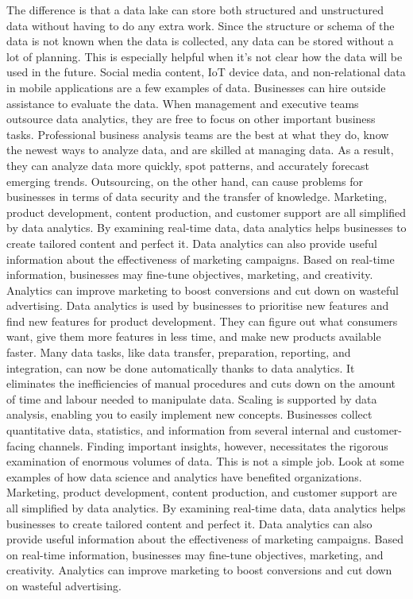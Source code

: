 \documentclass[journal]{IEEEtran}
\begin{document}
\par The difference is that a data lake can store both structured and unstructured data without having to do any extra work. Since the structure or schema of the data is not known when the data is collected, any data can be stored without a lot of planning. This is especially helpful when it's not clear how the data will be used in the future. Social media content, IoT device data, and non-relational data in mobile applications are a few examples of data. Businesses can hire outside assistance to evaluate the data. When management and executive teams outsource data analytics, they are free to focus on other important business tasks. Professional business analysis teams are the best at what they do, know the newest ways to analyze data, and are skilled at managing data. As a result, they can analyze  data more quickly, spot patterns, and accurately forecast emerging trends. Outsourcing, on the other hand, can cause problems for businesses in terms of data security and the transfer of knowledge. Marketing, product development, content production, and customer support are all simplified by data analytics. By examining real-time data, data analytics helps businesses to create tailored content and perfect it. Data analytics can also provide useful information about the effectiveness of marketing campaigns. Based on real-time information, businesses may fine-tune objectives, marketing, and creativity. Analytics can improve marketing to boost conversions and cut down on wasteful advertising. Data analytics is used by businesses to prioritise new features and find new features for product development. They can figure out what consumers want, give them more features in less time, and make new products available faster. Many data tasks, like data transfer, preparation, reporting, and integration, can now be done automatically thanks to data analytics. It eliminates the inefficiencies of manual procedures and cuts down on the amount of time and labour needed to manipulate data. Scaling is supported by data analysis, enabling you to easily implement new concepts. Businesses collect quantitative data, statistics, and information from several internal and customer-facing channels. Finding important insights, however, necessitates the rigorous examination of enormous volumes of data. This is not a simple job. Look at some examples of how data science and analytics have benefited organizations. Marketing, product development, content production, and customer support are all simplified by data analytics. By examining real-time data, data analytics helps businesses to create tailored content and perfect it. Data analytics can also provide useful information about the effectiveness of marketing campaigns. Based on real-time information, businesses may fine-tune objectives, marketing, and creativity. Analytics can improve marketing to boost conversions and cut down on wasteful advertising.
\end{document}
